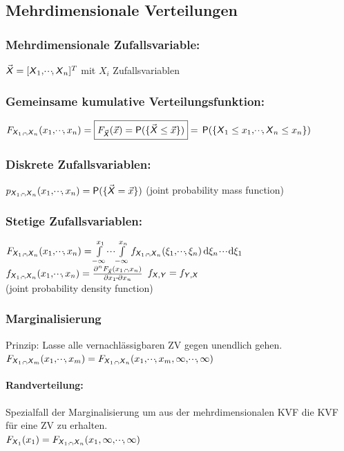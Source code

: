 \documentclass[german,color,6pt]{latex4ei/latex4ei_sheet}
\begin{document}
\begin{sectionbox}
	\subsection{Mehrdimensionale Verteilungen}
	\subsubsection{Mehrdimensionale Zufallsvariable:}
	$\vec{\operatorname{\textsf{\textit{X}}}} = [\operatorname{\textsf{\textit{X}}}_1,\!\cdot \!\cdot\!\cdot\!,\operatorname{\textsf{\textit{X}}}_n]^T$ mit $X_i$ Zufallsvariablen
	\subsubsection{Gemeinsame kumulative Verteilungsfunktion:}
	$F_{\X_1,\shdots,\X_n}(x_1,\shdots,x_n) = \boxed{F_{\vec{\X}}(\vec{x}) = \P(\{\vec{\X} \leq \vec{x}\})} = \newline
	\P(\{\X_1 \leq x_1,\shdots,\X_n \leq x_n\})$
	\subsubsection{Diskrete Zufallsvariablen:}
	$p_{\X_1,\shdots,\X_n}(x_1,\shdots,x_n) = \P(\{\vec{\X} = \vec{x}\})$ (joint probability mass function)
	\subsubsection{Stetige Zufallsvariablen:}
	$F_{\X_1,\shdots,\X_n}(x_1,\shdots,x_n) =\! \int\limits_{-\infty}^{x_1}\shdots\int\limits_{-\infty}^{x_n}{f_{\X_1,\shdots,\X_n}(\xi_1,\shdots,\xi_n)\diff\xi_n\shdots\diff\xi_1}$\\
	$f_{\X_1,\shdots,\X_n}(x_1,\shdots,x_n) = \frac{\partial^n F_{\vec{\X}}(x_1,\shdots,x_n)}{\partial x_1\shdots\partial x_n}$ \hfill $f_{\operatorname{\textsf{\textit{X}}},\operatorname{\textsf{\textit{Y}}}} = f_{\operatorname{\textsf{\textit{Y}}},\operatorname{\textsf{\textit{X}}}}$\\
	(joint probability density function)
	
	\subsubsection{Marginalisierung}
	Prinzip: Lasse alle vernachlässigbaren ZV gegen unendlich gehen. \\
	$F_{\X_1,\shdots,\X_m}(x_1,\shdots,x_m) =
	F_{\X_1,\shdots,\X_n}(x_1,\shdots,x_m,\infty,\shdots,\infty)$
	\paragraph{Randverteilung:}
	Spezialfall der Marginalisierung um aus der mehrdimensionalen KVF die KVF für eine ZV zu erhalten. \\
	$F_{\X_1}(x_1) = 
	F_{\X_1,\shdots,\X_n}(x_1,\infty,\shdots,\infty)$
	

\end{sectionbox}
\end{document}
